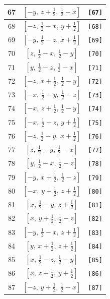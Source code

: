 \documentclass[fleqn,8pt]{jsarticle}
\begin{document}
\begin{longtable}{ccc}
67 & $\left[ - y,\, z + \frac{1}{2},\, \frac{1}{2} - x \right]$ & {\tt [67]} \\ \hline
68 & $\left[ - z,\, \frac{1}{2} - x,\, y + \frac{1}{2} \right]$ & {\tt [68]} \\ \hline
69 & $\left[ - y,\, \frac{1}{2} - z,\, x + \frac{1}{2} \right]$ & {\tt [69]} \\ \hline
70 & $\left[ z,\, \frac{1}{2} - x,\, \frac{1}{2} - y \right]$ & {\tt [70]} \\ \hline
71 & $\left[ y,\, \frac{1}{2} - z,\, \frac{1}{2} - x \right]$ & {\tt [71]} \\ \hline
72 & $\left[ - z,\, x + \frac{1}{2},\, \frac{1}{2} - y \right]$ & {\tt [72]} \\ \hline
73 & $\left[ - x,\, \frac{1}{2} - y,\, \frac{1}{2} - z \right]$ & {\tt [73]} \\ \hline
74 & $\left[ - x,\, z + \frac{1}{2},\, \frac{1}{2} - y \right]$ & {\tt [74]} \\ \hline
75 & $\left[ - x,\, \frac{1}{2} - z,\, y + \frac{1}{2} \right]$ & {\tt [75]} \\ \hline
76 & $\left[ - z,\, \frac{1}{2} - y,\, x + \frac{1}{2} \right]$ & {\tt [76]} \\ \hline
77 & $\left[ z,\, \frac{1}{2} - y,\, \frac{1}{2} - x \right]$ & {\tt [77]} \\ \hline
78 & $\left[ y,\, \frac{1}{2} - x,\, \frac{1}{2} - z \right]$ & {\tt [78]} \\ \hline
79 & $\left[ - y,\, x + \frac{1}{2},\, \frac{1}{2} - z \right]$ & {\tt [79]} \\ \hline
80 & $\left[ - x,\, y + \frac{1}{2},\, z + \frac{1}{2} \right]$ & {\tt [80]} \\ \hline
81 & $\left[ x,\, \frac{1}{2} - y,\, z + \frac{1}{2} \right]$ & {\tt [81]} \\ \hline
82 & $\left[ x,\, y + \frac{1}{2},\, \frac{1}{2} - z \right]$ & {\tt [82]} \\ \hline
83 & $\left[ - y,\, \frac{1}{2} - x,\, z + \frac{1}{2} \right]$ & {\tt [83]} \\ \hline
84 & $\left[ y,\, x + \frac{1}{2},\, z + \frac{1}{2} \right]$ & {\tt [84]} \\ \hline
85 & $\left[ x,\, \frac{1}{2} - z,\, \frac{1}{2} - y \right]$ & {\tt [85]} \\ \hline
86 & $\left[ x,\, z + \frac{1}{2},\, y + \frac{1}{2} \right]$ & {\tt [86]} \\ \hline
87 & $\left[ - z,\, y + \frac{1}{2},\, \frac{1}{2} - x \right]$ & {\tt [87]} \\ \hline

\end{longtable}
\end{document}
